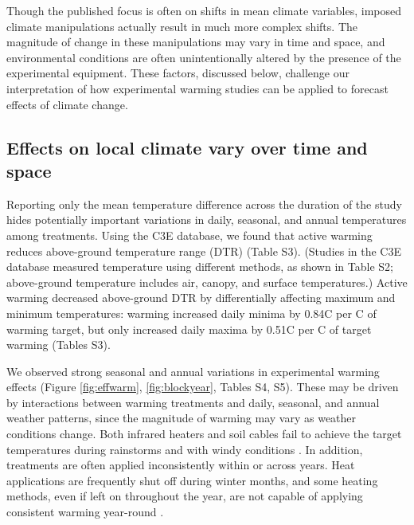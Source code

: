 \documentclass{article}
\begin{document}
\par Though the published focus is often on shifts in mean climate variables, imposed climate manipulations actually result in much more complex shifts. The magnitude of change in these manipulations may vary in time and space, and environmental conditions are often unintentionally altered by the presence of the experimental equipment. These factors, discussed below, challenge our interpretation of how experimental warming studies can be applied to forecast effects of climate change.

\subsection* {Effects on local climate vary over time and space}
Reporting only the mean temperature difference across the duration of the study hides potentially important variations in daily, seasonal, and annual temperatures among treatments. Using the C3E database, we found that active warming reduces above-ground temperature range (DTR) (Table S3). (Studies in the C3E database measured temperature using different methods, as shown in Table S2; above-ground temperature includes air, canopy, and surface temperatures.) Active warming decreased above-ground DTR by differentially affecting maximum and minimum temperatures: warming increased daily minima by 0.84\degree C per \degree C of warming target, but only increased daily maxima by 0.51\degree C per \degree C of target warming (Tables S3). %

\par We observed strong seasonal and annual variations in experimental warming effects (Figure \ref{fig:effwarm}, \ref{fig:blockyear}, Tables S4, S5). These may be driven by interactions between warming treatments and daily, seasonal, and annual weather patterns, since the magnitude of warming may vary as weather conditions change.  Both infrared heaters and soil cables fail to achieve the target temperatures during rainstorms \citep{peterjohn1993,hoeppner2012} and with windy conditions \citep{kimball2005,kimball2008}. In addition, treatments are often applied inconsistently within or across years. Heat applications are frequently shut off during winter months, and some heating methods, even if left on throughout the year, are not capable of applying consistent warming year-round \citep[e.g.][]{clark2014a,clark2014b,hagedorn2010}. 
\end{document}
